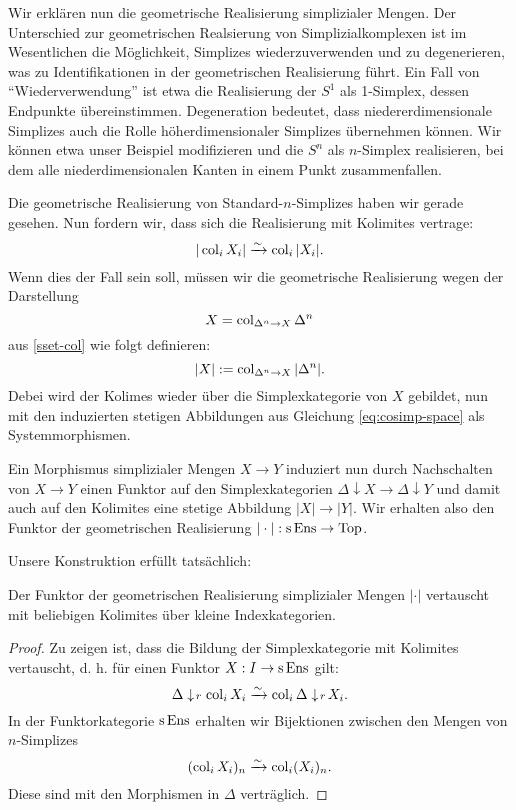 Wir erklären nun die geometrische Realisierung simplizialer
Mengen. Der Unterschied zur geometrischen Realsierung von
Simplizialkomplexen ist im Wesentlichen die Möglichkeit, Simplizes
wiederzuverwenden und zu degenerieren, was zu Identifikationen in der
geometrischen Realisierung führt. Ein Fall von ``Wiederverwendung''
ist etwa die Realisierung der $S^1$ als 1-Simplex, dessen Endpunkte
übereinstimmen. Degeneration bedeutet, dass niedererdimensionale
Simplizes auch die Rolle höherdimensionaler Simplizes übernehmen
können. Wir können etwa unser Beispiel modifizieren und die $S^n$ als
$n$-Simplex realisieren, bei dem alle niederdimensionalen Kanten in
einem Punkt zusammenfallen.

Die geometrische Realisierung von Standard-$n$-Simplizes haben wir
gerade gesehen. Nun fordern wir, dass sich die Realisierung mit
Kolimites vertrage:
\begin{equation} \label{eq:real-cocont}
  |\operatorname{col}_i X_i| \xrightarrow[]{\sim} \operatorname{col}_i |X_i|.
\end{equation}
Wenn dies der Fall sein soll, müssen wir die geometrische Realisierung
wegen der Darstellung
\[ X = \operatorname{col}_{\Delta^n \to X} \Delta^n \]
aus \ref{sset-col} wie folgt definieren:
\begin{equation} \label{eq:real-colim}
  |X| := \operatorname{col}_{\Delta^n \to X} |\Delta^n|.
\end{equation}
Debei wird der Kolimes wieder über die Simplexkategorie von $X$
gebildet, nun mit den induzierten stetigen Abbildungen aus Gleichung
\ref{eq:cosimp-space} als Systemmorphismen.

Ein Morphismus simplizialer Mengen $X \to Y$ induziert nun durch
Nachschalten von $X \to Y$ einen Funktor auf den Simplexkategorien
$\Delta \downarrow X \to \Delta \downarrow Y$ und damit auch auf den
Kolimites eine stetige Abbildung $|X| \to |Y|$. Wir erhalten also den
Funktor der geometrischen Realisierung $| \cdot |: \operatorname{s} \operatorname{Ens} \to \operatorname{Top}$.

Unsere Konstruktion erfüllt tatsächlich:
\begin{prop} \label{real-cocont}
  Der Funktor der geometrischen Realisierung simplizialer Mengen $|
  \cdot|$ vertauscht mit beliebigen Kolimites über kleine
  Indexkategorien.
\end{prop}
\begin{proof}
  Zu zeigen ist, dass die Bildung der Simplexkategorie mit Kolimites
  vertauscht, d. h. für einen Funktor $X: I \to \operatorname{s}\operatorname{Ens}$ gilt:
  \[ \Delta \downarrow \! {\scriptstyle r} \, \operatorname{col}_i X_i \xrightarrow[]{\sim} \operatorname{col}_i \Delta \downarrow \! {\scriptstyle r} \, X_i. \]
  In der Funktorkategorie $\operatorname{s}\operatorname{Ens}$ erhalten wir Bijektionen zwischen
  den Mengen von $n$-Simplizes
  \[ (\operatorname{col}_i X_i)_n \xrightarrow[]{\sim} \operatorname{col}_i (X_i)_n. \]
  Diese sind mit den Morphismen in $\Delta$ verträglich.
\end{proof}

